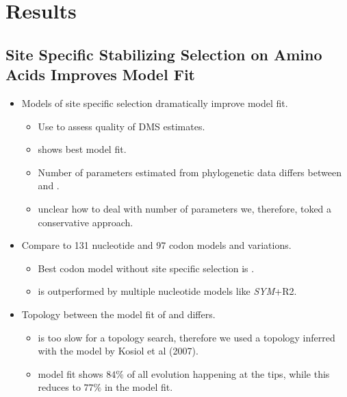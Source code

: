 \documentclass[12pt]{article}
\begin{document}
\section*{Results}
\subsection*{Site Specific Stabilizing Selection on Amino Acids Improves Model Fit}

\begin{itemize}
	\item Models of site specific selection dramatically improve model fit.
	\begin{itemize}
		\item Use \phydms to assess quality of DMS estimates.
		\item \selac shows best model fit.
		\item Number of parameters estimated from phylogenetic data differs between \selac and \phydms.
		\item unclear how to deal with number of parameters we, therefore, toked a conservative approach.
	\end{itemize}
	\item Compare to 131 nucleotide and 97 codon models and variations.
	\begin{itemize}
		\item Best codon model without site specific selection is \gy.
		\item \gy is outperformed by multiple nucleotide models like \emph{SYM}+R2.
	\end{itemize}
	\item Topology between the model fit of \phydms and \selac differs.
	\begin{itemize}
		\item \selac is too slow for a topology search, therefore we used a topology inferred with the model by Kosiol et al (2007).
		\item \selac model fit shows $84 \%$ of all evolution happening at the tips, while this reduces to $77 \%$ in the \phydms model fit.
	\end{itemize}
\end{itemize}
\end{document}
